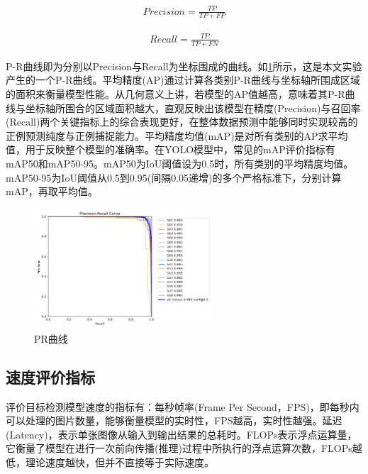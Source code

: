 \begin{equation}
    \begin{aligned}
    Precision = \frac{TP}{TP + FP}\label{eq:precision}
    \end{aligned}
\end{equation}


\begin{equation}
    \begin{aligned}
    Recall = \frac{TP}{TP + FN}\label{eq:recall}
    \end{aligned}
\end{equation}

P-R曲线即为分别以Precision与Recall为坐标围成的曲线。如\ref{fig:pr}所示，这是本文实验产生的一个P-R曲线。平均精度(AP)通过计算各类别P-R曲线与坐标轴所围成区域的面积来衡量模型性能。从几何意义上讲，若模型的AP值越高，意味着其P-R曲线与坐标轴所围合的区域面积越大，直观反映出该模型在精度(Precision)与召回率(Recall)两个关键指标上的综合表现更好，在整体数据预测中能够同时实现较高的正例预测纯度与正例捕捉能力。平均精度均值(mAP)是对所有类别的AP求平均值，用于反映整个模型的准确率。在YOLO模型中，常见的mAP评价指标有mAP50和mAP50-95。mAP50为IoU阈值设为0.5时，所有类别的平均精度均值。mAP50-95为IoU阈值从0.5到0.95(间隔0.05递增)的多个严格标准下，分别计算mAP，再取平均值。

\begin{figure}[!htb]
    \centering
    \includegraphics[width=0.6\textwidth]{figs/chap04/PR_curve.png}
    \caption{PR曲线}
    \label{fig:pr}
  \end{figure}

\subsection{速度评价指标}
评价目标检测模型速度的指标有：每秒帧率(Frame Per Second，FPS)，即每秒内可以处理的图片数量，能够衡量模型的实时性，FPS越高，实时性越强。延迟(Latency)，表示单张图像从输入到输出结果的总耗时。FLOPs表示浮点运算量，它衡量了模型在进行一次前向传播(推理)过程中所执行的浮点运算次数，FLOPs越低，理论速度越快，但并不直接等于实际速度。

